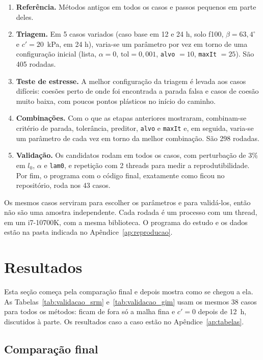 \documentclass[11pt,a4paper]{article}
\numberwithin{equation}{section}
\begin{document}
\begin{enumerate}
\item \textbf{Referência.} Métodos antigos em todos os casos e passos pequenos em parte deles.
\item \textbf{Triagem.} Em 5 casos variados (caso base em 12 e 24 h, solo f100, $\beta = 63{,}4^\circ$ e $c' = 20$~kPa, em 24 h), varia-se um parâmetro por vez em torno de uma configuração inicial (lista, $\alpha = 0$, $\mathrm{tol} = 0{,}001$, \texttt{alvo} $= 10$, \texttt{maxIt} $= 25$). São 405 rodadas.
\item \textbf{Teste de estresse.} A melhor configuração da triagem é levada aos casos difíceis: coesões perto de onde foi encontrada a parada falsa e casos de coesão muito baixa, com poucos pontos plásticos no início do caminho.
\item \textbf{Combinações.} Com o que as etapas anteriores mostraram, combinam-se critério de parada, tolerância, preditor, \texttt{alvo} e \texttt{maxIt} e, em seguida, varia-se um parâmetro de cada vez em torno da melhor combinação. São 298 rodadas.
\item \textbf{Validação.} Os candidatos rodam em todos os casos, com perturbação de 3\% em $l_0$, $\alpha$ e \texttt{lam0}, e repetição com 2 threads para medir a reprodutibilidade. Por fim, o programa com o código final, exatamente como ficou no repositório, roda nos 43 casos.
\end{enumerate}

Os mesmos casos serviram para escolher os parâmetros e para validá-los, então não são uma amostra independente. Cada rodada é um processo com um thread, em um i7-10700K, com a mesma biblioteca. O programa do estudo e os dados estão na pasta indicada no Apêndice~\ref{ap:reproducao}.


\section{Resultados}\label{sec:resultados}

Esta seção começa pela comparação final e depois mostra como se chegou a ela. As Tabelas~\ref{tab:validacao_srm} e~\ref{tab:validacao_gim} usam os mesmos 38 casos para todos os métodos: ficam de fora só a malha fina e $c' = 0$ depois de 12~h, discutidos à parte. Os resultados caso a caso estão no Apêndice~\ref{ap:tabelas}.

\subsection{Comparação final}\label{sec:comparacao}
\end{document}
